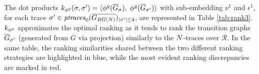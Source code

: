 {{\begin{example}%
	The dot products $k_{\gorgembed}(\logtrace,\nonlogtrace)=\braket{\gorgembed(\overline{G}_\logtrace),\;\gorgembed(\overline{G}_{\nonlogtrace})}$ with sub-embedding $\nu^1$ and $\epsilon^1$, for each trace $\nonlogtrace\in\WCal{0}{4}_{|\sigma'|\leq 4}$, are represented in Table \ref{tab:rank3}.%
	$k_{\gorgembed}$ approximates the optimal ranking as it tends to rank the transition graphs $\closed{G}_\nonlogtrace$ (generated from $\overline{G}$ via projection) similarly to the $\net$-traces over $\mathcal{R}$. In the same table, the ranking similarities shared between the two different ranking strategies are highlighted in blue, while the most evident ranking discrepancies are marked in red. %
\end{example}


}}
